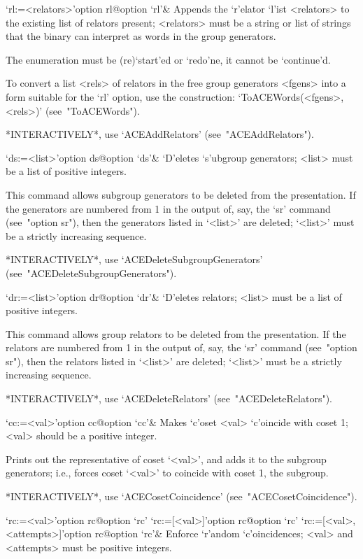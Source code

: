 \>`rl:=<relators>'{option rl}@{option `rl'}&
Appends the `r'elator  `l'ist  <relators>  to  the  existing  list  of
relators present; <relators> must be a string or list of strings  that
the {\ACE} binary can interpret as words in the group generators.

The enumeration must  be  (re)`start'ed  or  `redo'ne,  it  cannot  be
`continue'd.

To convert a  {\GAP}  list  <rels>  of  relators  in  the  free  group
generators <fgens> into a form suitable for the `rl' option,  use  the
construction: `ToACEWords(<fgens>, <rels>)' (see~"ToACEWords").

*INTERACTIVELY*, use `ACEAddRelators' (see~"ACEAddRelators").

\>`ds:=<list>'{option ds}@{option `ds'}&
`D'eletes `s'ubgroup generators; <list> must be  a  list  of  positive
integers.

This command  allows  subgroup  generators  to  be  deleted  from  the
presentation. If the generators are numbered from 1 in the output  of,
say, the `sr' command (see~"option sr"), then the generators listed in
`<list>' are deleted; `<list>' must be a strictly increasing sequence.

*INTERACTIVELY*,           use           `ACEDeleteSubgroupGenerators'
(see~"ACEDeleteSubgroupGenerators").

\>`dr:=<list>'{option dr}@{option `dr'}&
`D'eletes relators; <list> must be a list of positive integers.

This  command  allows  group  relators  to   be   deleted   from   the
presentation. If the relators are numbered from 1 in  the  output  of,
say, the `sr' command (see~"option sr"), then the relators  listed  in
`<list>' are deleted; `<list>' must be a strictly increasing sequence.

*INTERACTIVELY*, use `ACEDeleteRelators' (see~"ACEDeleteRelators").

\>`cc:=<val>'{option cc}@{option `cc'}&
Makes `c'oset <val>  `c'oincide  with  coset  1;  <val>  should  be  a
positive integer.

Prints out the representative of coset `<val>', and  adds  it  to  the
subgroup generators; i.e., forces coset `<val>' to coincide with coset
1, the subgroup.

*INTERACTIVELY*,               use               `ACECosetCoincidence'
(see~"ACECosetCoincidence").

\>`rc:=<val>'{option rc}@{option `rc'}
\>`rc:=[<val>]'{option rc}@{option `rc'}
\>`rc:=[<val>, <attempts>]'{option rc}@{option `rc'}&
Enforce `r'andom `c'oincidences; <val> and <attempts> must be positive
integers.

